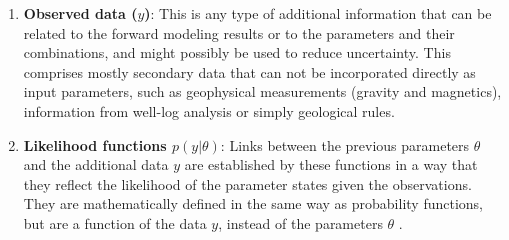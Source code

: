 \begin{enumerate}
        	\item \textbf{Observed data ($y$)}: This is any type of additional information that can be related to the forward modeling results or to the parameters and their combinations, and might possibly be used to reduce uncertainty. This comprises mostly secondary data that can not be incorporated directly as input parameters, such as geophysical measurements (gravity and magnetics), information from well-log analysis or simply geological rules. 
        	\item \textbf{Likelihood functions $p(y|\theta)$}: Links between the previous parameters $\theta$ and the additional data $y$ are established by these functions in a way that they reflect the likelihood of the parameter states given the observations. They are mathematically defined in the same way as probability functions, but are a function of the data $y$, instead of the parameters $\theta$ \citep{mackay2003information, patil2010pymc, delaVarga2016}.
        \end{enumerate}
        
